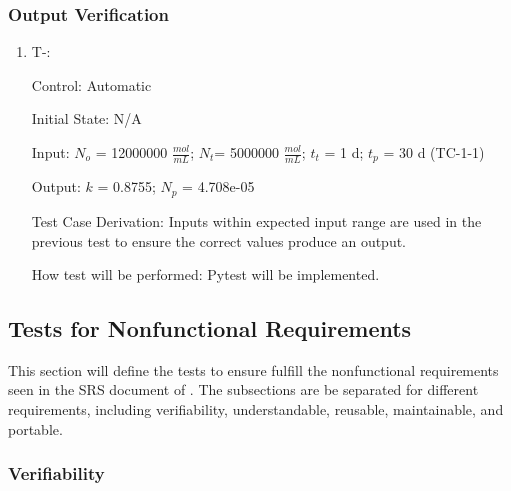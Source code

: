 \documentclass[12pt, titlepage]{article}
\newcounter{tinnum} %
\begin{document}
\subsubsection{Output Verification}\label{TO-1-1}

\begin{enumerate}

\item{T-}\thetinnum\label{T-8}:

Control: Automatic
					
Initial State: N/A
					
Input: $N_{o}$ = 12000000 $\frac{mol}{mL}$; $N_{t}$= 5000000 $\frac{mol}{mL}$; 
$t_{t}$ = 1 d; $t_{p}$ = 30 d (TC-1-1)
					
Output: $k$ = 0.8755; $N_p$ = 4.708e-05

Test Case Derivation: Inputs within expected input range are used in the 
previous test to ensure the correct values produce an output.
					
How test will be performed: Pytest will be implemented.


\end{enumerate}


\subsection{Tests for Nonfunctional Requirements} \label{tnfr}
  
This section will define the tests to ensure \progname{} fulfill the 
nonfunctional requirements seen in the SRS document of \progname{}. The 
subsections are be separated for different requirements, including 
verifiability, understandable, reusable, maintainable, and portable.

\subsubsection{Verifiability}
		
\end{document}

